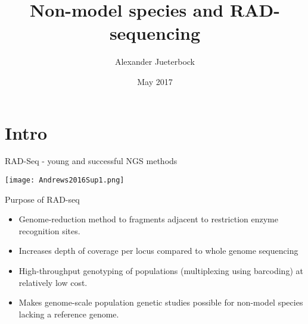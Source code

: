 \documentclass[presentation]{beamer}
\author{Alexander Jueterbock}
\date{May 2017}
\title{Non-model species and RAD-sequencing}
\begin{document}
\maketitle

\section{Intro}
\label{sec:org064264e}
\begin{frame}[label={sec:orgd47c9b8}]{RAD-Seq - young and successful NGS methods}
\begin{latex}
\begin{center}
\end{latex}


\begin{center}
\texttt{[image: Andrews2016Sup1.png]}
\end{center}

\end{frame}


\begin{frame}[label={sec:org388dee7}]{Purpose of RAD-seq}
\begin{itemize}
\item Genome-reduction method to fragments adjacent to restriction enzyme
recognition sites.
\item Increases depth of coverage per locus compared to whole genome
sequencing
\item High-throughput genotyping of populations (multiplexing using
barcoding) at relatively low cost.
\item Makes genome-scale population genetic studies possible for non-model
species lacking a reference genome.
\end{itemize}
\end{frame}
\end{document}
